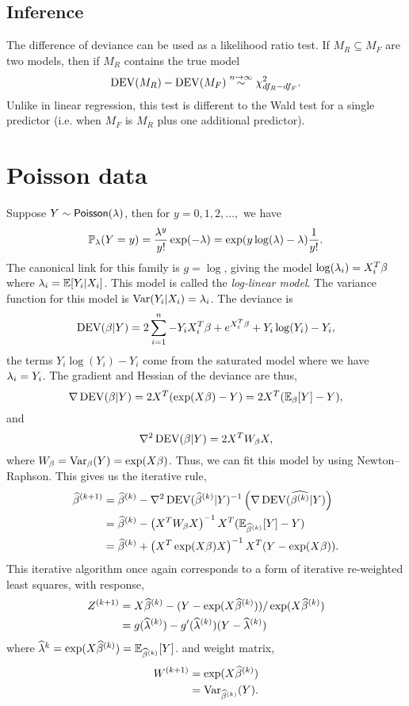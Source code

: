 {\subsection{Inference}
The difference of deviance can be used as a likelihood ratio test. If $M_R \subseteq M_F$ are two models, then if $M_R$ contains the true model 
\[\operatorname{DEV}(M_R)-\operatorname{DEV}(M_F) \stackrel{n \to \infty}{\sim} \chi^2_{df_R-df_F}. \]
Unlike in linear regression, this test is different to the Wald test for a single predictor (i.e. when $M_F$ is $M_R$ plus one additional predictor).
\section{Poisson data}
Suppose $Y \sim \mathsf{Poisson}(\lambda)$, then for $y=0,1,2,\ldots,$ we have
\[{\mathbb{P}}_\lambda(Y=y) = \frac{\lambda^y}{y!}\exp(-\lambda) = \exp(y \log(\lambda)-\lambda)\frac{1}{y!}. \]
The canonical link for this family is $g = \log$, giving the model $\log(\lambda_i) = X_i^T\beta$ where $\lambda_i = {\mathbb{E}}[Y_i|X_i]$. This model is called the \emph{log-linear model}. The variance function for this model is $\operatorname{Var}(Y_i|X_i) = \lambda_i$. The deviance is 
\[\operatorname{DEV}(\beta|Y) = 2\sum_{i=1}^n -Y_iX_i^T\beta+e^{X_i^T\beta}+Y_i\log(Y_i)-Y_i,  \]
the terms $Y_i\log(Y_i)-Y_i$ come from the saturated model where we have $\lambda_i = Y_i$. The gradient and Hessian of the deviance are thus,
\[\nabla \operatorname{DEV}(\beta|Y) = 2X^T(\exp(X\beta)-Y) = 2X^T({\mathbb{E}}_{\beta}[Y]-Y), \]
and
\[\nabla^2 \operatorname{DEV}(\beta|Y) = 2X^TW_{\beta}X, \]
where $W_{\beta} = \operatorname{Var}_\beta(Y) = \exp(X\beta)$. Thus, we can fit this model by using Newton--Raphson. This gives us the iterative rule,
\begin{align*}
    \widehat{\beta}^{(k+1)} &= \widehat{\beta}^{(k)} -  \nabla^2 \operatorname{DEV}(\widehat{\beta}^{(k)}|Y)^{-1}\left(\nabla\operatorname{DEV}(\widehat{{\beta}^{(k)}}|Y)\right)\\
    &=\widehat{\beta}^{(k)} - \left(X^TW_{\beta}X\right)^{-1}X^T({\mathbb{E}}_{\widehat{\beta}^{(k)}}[Y]-Y)\\
    &=\widehat{\beta}^{(k)} + \left(X^T\exp(X\beta)X\right)^{-1}X^T(Y-\exp(X\beta)).
\end{align*}
This iterative algorithm once again corresponds to a form of iterative re-weighted least squares, with response,
\begin{align*}
    Z^{(k+1)} &= X\widehat{\beta}^{(k)} -  (Y-\exp(X\widehat{\beta}^{(k)}))/\exp(X\widehat{\beta}^{(k)})\\
    &=g(\widehat{\lambda}^{(k)}) - g'(\widehat{\lambda}^{(k)})(Y-\widehat{\lambda}^{(k)})
\end{align*}
where $\widehat{\lambda}^{k} = \exp(X\widehat{\beta}^{(k)}) = {\mathbb{E}}_{\widehat{\beta}^{(k)}}[Y]$.
and weight matrix,
\begin{align*}
    W^{(k+1)} &= \exp(X\widehat{\beta}^{(k)})\\
    &=\operatorname{Var}_{\widehat{\beta}^{(k)}}(Y).
\end{align*}
}
